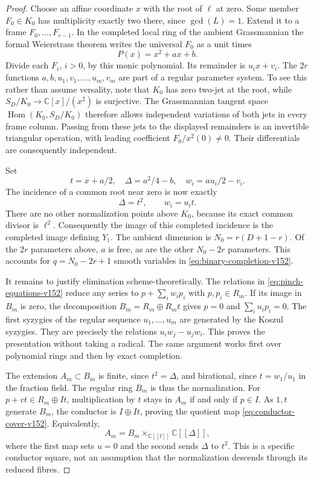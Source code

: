 \documentclass[11pt,reqno]{amsart}
\numberwithin{equation}{section}
\theoremstyle{definition}\newtheorem{definition}[theorem]{Definition}
\theoremstyle{remark}\newtheorem{remark}[theorem]{Remark}
\newcommand{\C}{\mathbb C}\newcommand{\Q}{\mathbb Q}
\DeclareMathOperator{\Hom}{Hom}\DeclareMathOperator{\Tot}{Tot}
\begin{document}
\begin{proof}
Choose an affine coordinate $x$ with the root of $\ell$ at zero.
Some member $F_0\in K_0$ has multiplicity exactly two there, since
$\gcd(L)=1$.  Extend it to a frame $F_0,\ldots,F_{r-1}$.
In the completed local ring of the ambient Grassmannian the formal
Weierstrass theorem writes the universal $F_0$ as a unit times
\[
                         P(x)=x^2+a x+b.
\]
Divide each $F_i$, $i>0$, by this monic polynomial.  Its remainder
is $u_i x+v_i$.  The $2r$ functions
$a,b,u_1,v_1,\ldots,u_m,v_m$ are part of a regular parameter
system.  To see this rather than assume versality, note that
$K_0$ has zero two-jet at the root, while
$S_D/K_0\to\C[x]/(x^2)$ is surjective.  The Grassmannian tangent
space $\Hom(K_0,S_D/K_0)$ therefore allows independent variations
of both jets in every frame column.  Passing from these jets to
the displayed remainders is an invertible triangular operation,
with leading coefficient $F_0/x^2(0)\ne0$.  Their differentials
are consequently independent.

Set
\[
       t=x+a/2,\quad \Delta=a^2/4-b,\quad
       w_i=a u_i/2-v_i.
\]
The incidence of a common root near zero is now exactly
\[
                       \Delta=t^2,\qquad w_i=u_i t.
\]
There are no other normalization points above $K_0$, because its
exact common divisor is $\ell^2$.  Consequently the image of this
completed incidence is the completed image defining $Y_1$.
The ambient dimension is $N_0=r(D+1-r)$.  Of the $2r$ parameters
above, $a$ is free, as are the other $N_0-2r$ parameters.  This
accounts for $q=N_0-2r+1$ smooth variables in
\eqref{eq:binary-completion-v152}.

It remains to justify elimination scheme-theoretically.  The
relations in \eqref{eq:pinch-equations-v152} reduce any series to
$p+\sum_i w_i p_i$ with $p,p_i\in R_m$.  If its image in $B_m$
is zero, the decomposition $B_m=R_m\oplus R_m t$ gives
$p=0$ and $\sum_i u_i p_i=0$.  The first syzygies of the regular
sequence $u_1,\ldots,u_m$ are generated by the Koszul syzygies.
They are precisely the relations $u_iw_j-u_jw_i$.  This proves
the presentation without taking a radical.  The same argument
works first over polynomial rings and then by exact completion.

The extension $A_m\subset B_m$ is finite, since $t^2=\Delta$,
and birational, since $t=w_1/u_1$ in the fraction field.  The
regular ring $B_m$ is thus the normalization.  For
$p+v t\in R_m\oplus I t$, multiplication by $t$ stays in
$A_m$ if and only if $p\in I$.  As $1,t$ generate $B_m$,
the conductor is $I\oplus I t$, proving the quotient map
\eqref{eq:conductor-cover-v152}.  Equivalently,
\begin{equation}\label{eq:pinch-square-v152}
 A_m=B_m\mathbin{\times}_{\C[[t]]}\C[[\Delta]],
\end{equation}
where the first map sets $u=0$ and the second sends $\Delta$ to
$t^2$.  This is a specific conductor square, not an assumption
that the normalization descends through its reduced fibres.


\end{proof}
\end{document}
